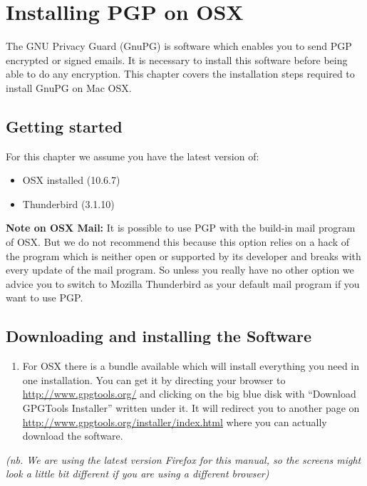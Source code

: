 \section{Installing PGP on OSX}

The GNU Privacy Guard (GnuPG) is software which enables you to send PGP
encrypted or signed emails. It is necessary to install this software
before being able to do any encryption. This chapter covers the
installation steps required to install GnuPG on Mac OSX.

\subsection{Getting started}

For this chapter we assume you have the latest version of:

\begin{itemize}
\item
  OSX installed (10.6.7)
\item
  Thunderbird (3.1.10)
\end{itemize}
\textbf{Note on OSX Mail:} It is possible to use PGP with the build-in
mail program of OSX. But we do not recommend this because this option
relies on a hack of the program which is neither open or supported by
its developer and breaks with every update of the mail program. So
unless you really have no other option we advice you to switch to
Mozilla Thunderbird as your default mail program if you want to use PGP.

\subsection{Downloading and installing the Software}

\begin{enumerate}[1.]
\item
  For OSX there is a bundle available which will install everything you
  need in one installation. You can get it by directing your browser to
  \href{http://www.gpgtools.org/}{http://www.gpgtools.org/} and clicking
  on the big blue disk with ``Download GPGTools Installer'' written
  under it. It will redirect you to another page on
  \href{http://www.gpgtools.org/installer/index.html}{http://www.gpgtools.org/installer/index.html}
  where you can actually download the software.
\end{enumerate}
\emph{(nb. We are using the latest version Firefox for this manual, so
the screens might look a little bit different if you are using a
different browser)}

